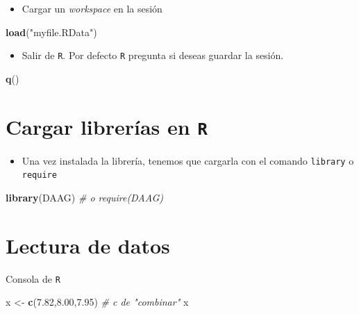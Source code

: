 \documentclass[]{book}
\newenvironment{Shaded}{\begin{snugshade}}{\end{snugshade}}
\newcommand{\KeywordTok}[1]{\textcolor[rgb]{0.13,0.29,0.53}{\textbf{#1}}}
\newcommand{\FloatTok}[1]{\textcolor[rgb]{0.00,0.00,0.81}{#1}}
\newcommand{\StringTok}[1]{\textcolor[rgb]{0.31,0.60,0.02}{#1}}
\newcommand{\CommentTok}[1]{\textcolor[rgb]{0.56,0.35,0.01}{\textit{#1}}}
\newcommand{\NormalTok}[1]{#1}
\providecommand{\tightlist}{%
  \setlength{\itemsep}{0pt}\setlength{\parskip}{0pt}}
\begin{document}
\begin{itemize}
\tightlist
\item
  Cargar un \emph{workspace} en la sesión
\end{itemize}

\begin{Shaded}
\begin{Highlighting}[]
\KeywordTok{load}\NormalTok{(}\StringTok{"myfile.RData"}\NormalTok{) }
\end{Highlighting}
\end{Shaded}

\begin{itemize}
\tightlist
\item
  Salir de \texttt{R}. Por defecto \texttt{R} pregunta si deseas guardar
  la sesión.
\end{itemize}

\begin{Shaded}
\begin{Highlighting}[]
\KeywordTok{q}\NormalTok{()}
\end{Highlighting}
\end{Shaded}

\section{\texorpdfstring{Cargar librerías en
\texttt{R}}{Cargar librerías en R}}\label{cargar-libreruxedas-en-r}

\begin{itemize}
\tightlist
\item
  Una vez instalada la librería, tenemos que cargarla con el comando
  \texttt{library} o \texttt{require}
\end{itemize}

\begin{Shaded}
\begin{Highlighting}[]
\KeywordTok{library}\NormalTok{(DAAG) }\CommentTok{# o require(DAAG)}
\end{Highlighting}
\end{Shaded}

\section{Lectura de datos}\label{lectura-de-datos}

Consola de \texttt{R}

\begin{Shaded}
\begin{Highlighting}[]
\NormalTok{x <-}\StringTok{ }\KeywordTok{c}\NormalTok{(}\FloatTok{7.82}\NormalTok{,}\FloatTok{8.00}\NormalTok{,}\FloatTok{7.95}\NormalTok{) }\CommentTok{# c de "combinar"}
\NormalTok{x}
\end{Highlighting}
\end{Shaded}
\end{document}
